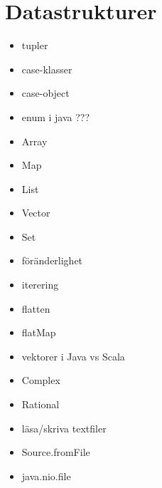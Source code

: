 \chapter{Datastrukturer}\label{chapter:W04}
\begin{itemize}[nosep]
\item tupler
\item case-klasser
\item case-object
\item enum i java ???
\item Array
\item Map
\item List
\item Vector
\item Set
\item föränderlighet
\item iterering
\item flatten
\item flatMap
\item vektorer i Java vs Scala
\item Complex
\item Rational
\item läsa/skriva textfiler
\item Source.fromFile
\item java.nio.file
\end{itemize}